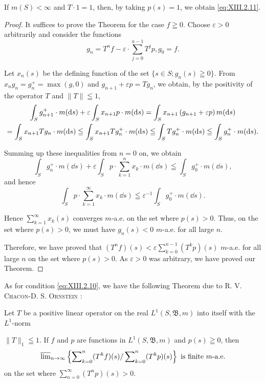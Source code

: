 If $m(S) < \infty$ and $T \cdot 1 = 1$, then, by taking $p(s) = 1$, we obtain \eqref{eq:XIII.2.11}. \begin{proof}
It suffices to prove the Theorem for the case $f \geqq 0$. Choose $\varepsilon > 0$ arbitrarily and consider the functions 
\[
g _{n} = T ^{n} f - \varepsilon \cdot \sum\limits_{j=0} ^{n-1} T ^{j} p, g _{0} = f.
\]

Let $x_{n}(s)$ be the defining function of the set $\{s \in S; g_{n}(s) \geqq 0\}$. From $x_{n}g_{n} = g_{n}^{+} = \max(g, 0)$ and $g_{n+1} + \varepsilon p = Tg_{n}$, we obtain, by the positivity of the operator $T$ and $\|T\| \leqq 1$, 
\begin{gather}\int_{S} g _{n+1} ^{+} \cdot m (\dd s) + \varepsilon \int_{S} x _{n+1} p \cdot m (\dd s) = \int_{S} x _{n+1} \left(g _{n+1} + \varepsilon p\right) m (\dd s) \notag \\= \int_{S} x _{n+1} T g _{n} \cdot m (\dd s) \leqq \int_{S} x _{n+1} T g _{n} ^{+} \cdot m (\dd s) \leqq \int_{S} T g _{n} ^{+} \cdot m (\dd s) \leqq \int_{S} g _{n} ^{+} \cdot m (\dd s). \notag
\end{gather}

Summing up these inequalities from $n = 0$ on, we obtain 
\[
\int_{S} g _{n} ^{+} \cdot m (\dd s) + \varepsilon \int_{S} p \cdot \sum\limits_{k=1} ^{n} x _{k} \cdot m (\dd s) \leqq \int_{S} g _{0} ^{+} \cdot m (\dd s),
\]
and hence 
\[
\int_{S} p \cdot \sum\limits_{k=1} ^{\infty} x _{k} \cdot m (\dd s) \leqq \varepsilon^{-1} \int_{S} g _{0} ^{+} \cdot m (\dd s).
\]

Hence $\sum\limits_{k=1}^{\infty} x_k(s)$ converges $m$-a.e. on the set where $p(s) > 0$. Thus, on the set where $p(s) > 0$, we must have $g_n(s) < 0$ $m$-a.e. for all large $n$. 

Therefore, we have proved that $(T^n f)(s) < \varepsilon \sum\limits_{k=0}^{n-1} (T^k p)(s)$ $m$-a.e. for all large $n$ on the set where $p(s) > 0$. As $\varepsilon > 0$ was arbitrary, we have proved our Theorem. 
\end{proof}

As for condition \eqref{eq:XIII.2.10}, we have the following Theorem due to R. V. \textsc{Chacon}-D. S. \textsc{Ornstein} \cite{chacon32}: 

\begin{theorem}\label{thm:XIII.2.Theorem.4} Let $T$ be a positive linear operator on the real $L^{1}(S, \mathfrak{B}, m)$ into itself with the $L^{1}$-norm

$\| T \|_{1} \leqq 1$. If $f$ and $p$ are functions in $L^{1}(S, \mathfrak{B}, m)$ and $p(s) \geqq 0$, then 
\[
\varlimsup\limits_{n \rightarrow \infty} \left\{\sum\limits_{k=0} ^{n} (T ^{k} f) (s) / \sum\limits_{k=0} ^{n} (T ^{k} p) (s) \right\} \text{ is finite } m\text{-a.e.}
\]
on the set where $\sum\limits_{n=0}^{\infty}\left(T^{n}p\right)(s)>0$. 
\end{theorem}

